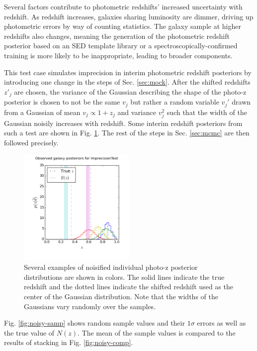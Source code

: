 \documentclass[preprint]{aastex}
\begin{document}
Several factors contribute to photometric redshifts' increased uncertainty with 
redshift.  As redshift increases, galaxies sharing luminosity are dimmer, 
driving up photometric errors by way of counting statistics.  The galaxy sample 
at higher redshifts also changes, meaning the generation of the photometric 
redshift posterior based on an SED template library or a 
spectroscopically-confirmed training is more likely to be inappropriate, 
leading to broader components.

This test case simulates imprecision in interim photometric redshift posteriors 
by introducing one change in the steps of Sec. \ref{sec:mock}.  After the 
shifted redshifts $z'_{j}$ are chosen, the variance of the Gaussian describing 
the shape of the photo-z posterior is chosen to not be the same $v_{j}$ but 
rather a random variable $v_{j}'$ drawn from a Gaussian of mean $v_{j}\propto 
1+z_{j}$ and variance $v_{j}^{2}$ such that the width of the Gaussian noisily 
increases with redshift.  Some interim redshift posteriors from such a test are 
shown in Fig. \ref{fig:noisypzs}.  The rest of the steps in Sec. \ref{sec:mcmc} 
are then followed precisely.

\begin{figure}
\includegraphics[width=0.5\textwidth]{sigma/samplepzs.png}
\caption{Several examples of noisified individual photo-z posterior 
distributions are shown in colors.  The solid lines indicate the true redshift 
and the dotted lines indicate the shifted redshift used as the center of the 
Gaussian distribution.  Note that the widths of the Gaussians vary randomly 
over the samples.}
\label{fig:noisypzs}
\end{figure}

Fig. \ref{fig:noisy-samp} shows random sample values and their $1\sigma$ errors 
as well as the true value of $N(z)$.  The mean of the sample values is compared 
to the results of stacking in Fig. \ref{fig:noisy-comp}.
\end{document}
